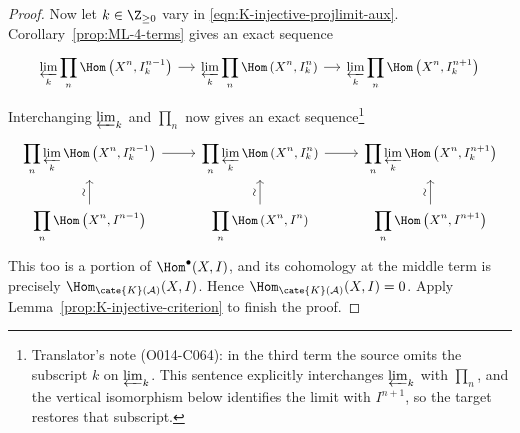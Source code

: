 \begin{proof}
	Now let $k\in\Z_{\geq0}$ vary in
	\eqref{eqn:K-injective-projlimit-aux}.
	Corollary~\ref{prop:ML-4-terms} gives an exact sequence
	\[\begin{tikzcd}
		[column sep=small, every cell/.append style = {font = \small}]
		\displaystyle\varprojlim_k \displaystyle\prod_n
		\Hom\left( X^n, I_k^{n-1} \right) \arrow[r] &
		\displaystyle\varprojlim_k \displaystyle\prod_n
		\Hom\left( X^n, I_k^n \right) \arrow[r] &
		\displaystyle\varprojlim_k \displaystyle\prod_n
		\Hom\left( X^n, I_k^{n+1} \right)
	\end{tikzcd}\]
	Interchanging $\varprojlim_k$ and $\prod_n$ now gives an exact
	sequence\footnote{Translator's note (O014-C064): in the third term the
	source omits the subscript $k$ on $\varprojlim_k$. This sentence
	explicitly interchanges $\varprojlim_k$ with $\prod_n$, and the vertical
	isomorphism below identifies the limit with $I^{n+1}$, so the target
	restores that subscript.}
	\[\begin{tikzcd}
		[every cell/.append style = {font = \small}]
		\displaystyle\prod_n \varprojlim_k
		\Hom\left( X^n, I_k^{n-1} \right) \arrow[r] &
		\displaystyle\prod_n \varprojlim_k
		\Hom\left( X^n, I_k^n \right) \arrow[r] &
		\displaystyle\prod_n \varprojlim_k
		\Hom\left( X^n, I_k^{n+1} \right) \\
		\displaystyle\prod_n \Hom\left( X^n, I^{n-1} \right)
		\arrow[u, "\sim" sloped] &
		\displaystyle\prod_n \Hom\left( X^n, I^n \right)
		\arrow[u, "\sim" sloped] &
		\displaystyle\prod_n \Hom\left( X^n, I^{n+1} \right)
		\arrow[u, "\sim" sloped]
	\end{tikzcd}\]
	This too is a portion of $\Hom^\bullet(X,I)$, and its cohomology at the
	middle term is precisely
	$\Hom_{\cate{K}(\mathcal{A})}(X,I)$. Hence
	$\Hom_{\cate{K}(\mathcal{A})}(X,I)=0$. Apply
	Lemma~\ref{prop:K-injective-criterion} to finish the proof.
\end{proof}

